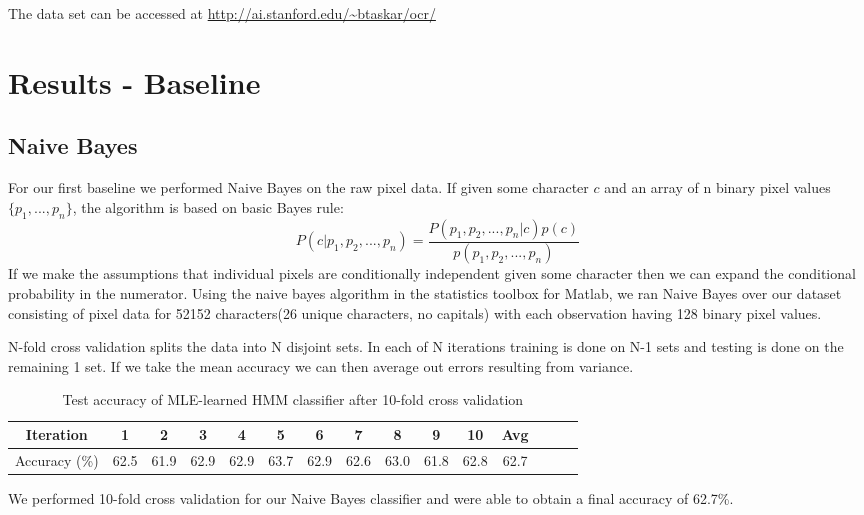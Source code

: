 \documentclass{article} %
\begin{document}
The data set can be accessed at \url{http://ai.stanford.edu/~btaskar/ocr/}

\section{Results - Baseline}
\subsection{Naive Bayes}
For our first baseline we performed Naive Bayes on the raw pixel data.
If given some character $c$ and an array of n binary pixel values $\{p_1, ..., p_n\}$, the algorithm is based on basic Bayes rule:
$$P(c|p_1, p_2, ... , p_n) = \frac{P(p_1, p_2, ... , p_n|c)p(c)}{p(p_1, p_2, ... , p_n)}$$
If we make the assumptions that individual pixels are conditionally independent given some character then we can expand the conditional probability in the numerator. Using the naive bayes algorithm in the statistics toolbox for Matlab, we ran Naive Bayes over our dataset consisting of pixel data for 52152 characters(26 unique characters, no capitals) with each observation having 128 binary pixel values.

N-fold cross validation splits the data into N disjoint sets. In each of N iterations training is done on N-1 sets and testing is done on the remaining 1 set. If we take the mean accuracy we can then average out errors resulting from variance.


\begin{table}[h]
\centering
\begin{tabular}{|c|c|c|c|c|c|c|c|c|c|c|c|c|c|c|}
\hline
Iteration & 1 & 2 & 3 & 4 & 5 & 6 & 7 & 8 & 9 & 10 & Avg \\
\hline
Accuracy (\%) & 62.5 & 61.9 & 62.9 & 62.9 & 63.7 & 62.9 & 62.6 & 63.0 & 61.8 & 62.8 & 62.7\\
\hline
\end{tabular}
\caption{Test accuracy of MLE-learned HMM classifier after 10-fold cross validation}
\label{tab:mid-logr-results}
\end{table}

We performed 10-fold cross validation for our Naive Bayes classifier and were able to obtain a final accuracy of 62.7\%.
\end{document}
